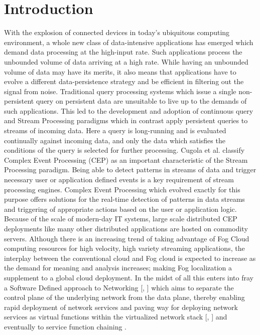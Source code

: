 \chapter{Introduction} 
With the explosion of connected devices in today's ubiquitous computing environment, a whole new class of data-intensive applications has emerged which demand data processing at the high-input rate. Such applications process the unbounded volume of data arriving at a high rate. While having an unbounded volume of data may have its merits, it also means that applications have to evolve a different data-persistence strategy and be efficient in filtering out the signal from noise. Traditional query processing systems which issue a single non-persistent query on persistent data are unsuitable to live up to the demands of such applications. This led to the development and adoption of continuous query \cite{Chen} and Stream Processing \cite{chakravarthy} paradigms which in contrast apply persistent queries to streams of incoming data. Here a query is long-running and is evaluated continually against incoming data, and only the data which satisfies the conditions of the query is selected for further processing. Cugola et al. \cite{cugola2012processing} classify Complex Event Processing (CEP) as an important characteristic of the Stream Processing paradigm. Being able to detect patterns in streams of data and trigger necessary user or application defined events is a key requirement of stream processing engines. Complex Event Processing which evolved exactly for this purpose offers solutions for the real-time detection of patterns in data streams and triggering of appropriate actions based on the user or application logic. 
\newline \newline
Because of the scale of modern-day IT systems, large scale distributed CEP deployments like many other distributed applications are hosted on commodity servers. Although there is an increasing trend of taking advantage of Fog Cloud computing resources \cite{bonomi2012fog} for high velocity, high variety streaming applications, the interplay between the conventional cloud and Fog cloud is expected to increase as the demand for meaning and analysis increases; making Fog localization a supplement to a global cloud deployment.  
In the midst of all this enters into fray a Software Defined approach to Networking [\cite{Jain}, \cite{casado}] which aims to separate the control plane of the underlying network from the data plane, thereby enabling rapid deployment of network services and paving way for deploying network services as virtual functions within the virtualized network stack [\cite{sherwood2009flowvisor},\cite{han2015network} ] and eventually to service function chaining \cite{halpern2015service}. 
